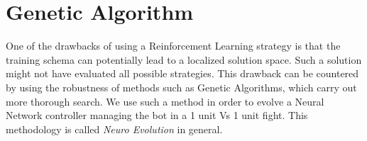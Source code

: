 \section{Genetic Algorithm}
\label{section:GA}
One of the drawbacks of using a Reinforcement Learning strategy is that the training schema can potentially lead to a localized solution space. Such a solution might not have evaluated all possible strategies. This drawback can be countered by using the robustness of methods such as Genetic Algorithms, which carry out more thorough search. We use such a method in order to evolve a Neural Network controller managing the bot in a 1 unit Vs 1 unit fight. This methodology is called \emph{Neuro Evolution} in general.

